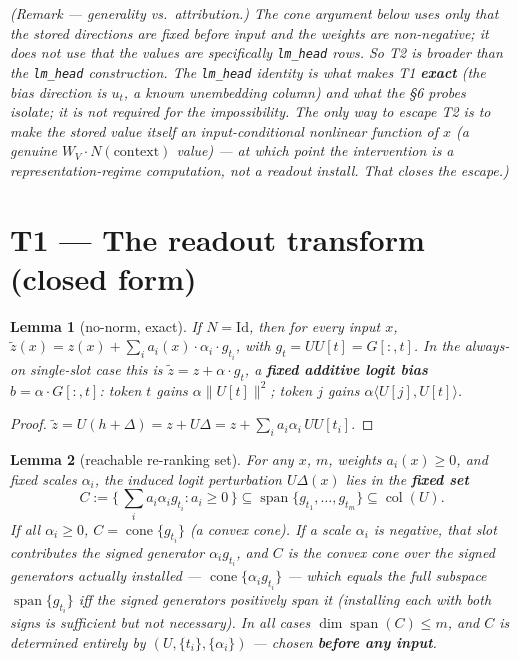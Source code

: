 \documentclass[11pt]{article}
\theoremstyle{plain}
\newtheorem{lemma}{Lemma}
\theoremstyle{definition}
\begin{document}
\emph{(Remark --- generality vs.\ attribution.) The cone argument below uses only that the stored directions are fixed before input and the weights are non-negative; it does not use that the values are specifically \texttt{lm\_head} rows. So T2 is broader than the \texttt{lm\_head} construction. The \texttt{lm\_head} identity is what makes T1 \textbf{exact} (the bias direction is $u_t$, a known unembedding column) and what the \S 6 probes isolate; it is not required for the impossibility. The only way to escape T2 is to make the stored value itself an input-conditional nonlinear function of $x$ (a genuine $W_V \cdot N(\text{context})$ value) --- at which point the intervention is a representation-regime computation, not a readout install. That closes the escape.)}

\section{T1 — The readout transform (closed form)}

\begin{lemma}[no-norm, exact]
If $N = \mathrm{Id}$, then for every input $x$, $\tilde z(x) = z(x) + \sum_i a_i(x)\cdot\alpha_i\cdot g_{t_i}$, with $g_t = U U[t] = G[:,t]$. In the always-on single-slot case this is $\tilde z = z + \alpha\cdot g_t$, a \textbf{fixed additive logit bias} $b = \alpha\cdot G[:,t]$: token $t$ gains $\alpha\lVert U[t]\rVert^2$; token $j$ gains $\alpha\langle U[j],U[t]\rangle$.
\end{lemma}

\begin{proof}
$\tilde z = U(h+\Delta) = z + U\Delta = z + \sum_i a_i \alpha_i\, U U[t_i]$.
\end{proof}

\begin{lemma}[reachable re-ranking set]
For any $x$, $m$, weights $a_i(x) \ge 0$, and fixed scales $\alpha_i$, the induced logit perturbation $U\Delta(x)$ lies in the \textbf{fixed set}
\[
C := \{\, \textstyle\sum_i a_i \alpha_i g_{t_i} : a_i \ge 0 \,\} \subseteq \operatorname{span}\{g_{t_1},\dots,g_{t_m}\} \subseteq \operatorname{col}(U).
\]
If all $\alpha_i \ge 0$, $C = \operatorname{cone}\{g_{t_i}\}$ (a convex cone). If a scale $\alpha_i$ is negative, that slot contributes the signed generator $\alpha_i g_{t_i}$, and $C$ is the convex cone over the signed generators \emph{actually installed} — $\operatorname{cone}\{\alpha_i g_{t_i}\}$ — which equals the full subspace $\operatorname{span}\{g_{t_i}\}$ iff the signed generators positively span it (installing each with both signs is sufficient but not necessary). In all cases $\dim\operatorname{span}(C) \le m$, and $C$ is determined entirely by $(U, \{t_i\}, \{\alpha_i\})$ — chosen \textbf{before any input}.
\end{lemma}
\end{document}
